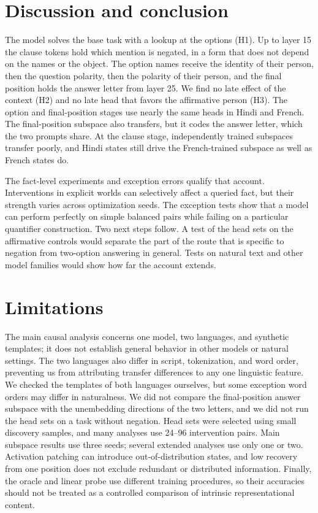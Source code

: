 \documentclass[11pt]{article}
\begin{document}
\section{Discussion and conclusion}
\label{sec:discussion}
The model solves the base task with a lookup at the options (H1). Up to layer 15 the clause tokens hold which mention is negated, in a form that does not depend on the names or the object. The option names receive the identity of their person, then the question polarity, then the polarity of their person, and the final position holds the answer letter from layer 25. We find no late effect of the context (H2) and no late head that favors the affirmative person (H3). The option and final-position stages use nearly the same heads in Hindi and French. The final-position subspace also transfers, but it codes the answer letter, which the two prompts share. At the clause stage, independently trained subspaces transfer poorly, and Hindi states still drive the French-trained subspace as well as French states do.

The fact-level experiments and exception errors qualify that account. Interventions in explicit worlds can selectively affect a queried fact, but their strength varies across optimization seeds. The exception tests show that a model can perform perfectly on simple balanced pairs while failing on a particular quantifier construction. Two next steps follow. A test of the head sets on the affirmative controls would separate the part of the route that is specific to negation from two-option answering in general. Tests on natural text and other model families would show how far the account extends.

\section*{Limitations}
The main causal analysis concerns one model, two languages, and synthetic templates; it does not establish general behavior in other models or natural settings. The two languages also differ in script, tokenization, and word order, preventing us from attributing transfer differences to any one linguistic feature. We checked the templates of both languages ourselves, but some exception word orders may differ in naturalness. We did not compare the final-position answer subspace with the unembedding directions of the two letters, and we did not run the head sets on a task without negation. Head sets were selected using small discovery samples, and many analyses use 24--96 intervention pairs. Main subspace results use three seeds; several extended analyses use only one or two. Activation patching can introduce out-of-distribution states, and low recovery from one position does not exclude redundant or distributed information. Finally, the oracle and linear probe use different training procedures, so their accuracies should not be treated as a controlled comparison of intrinsic representational content.
\end{document}
